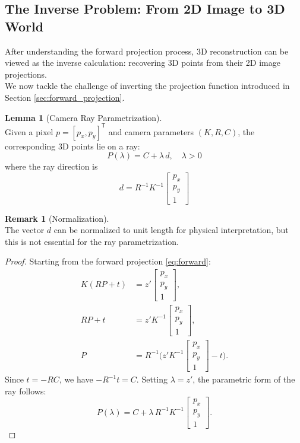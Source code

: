 \documentclass[12pt,a4paper]{article}
\theoremstyle{definition}
\newtheorem{lemma}{Lemma}[subsection]
\newtheorem{remark}{Remark}[subsection]
\begin{document}
\newpage

\subsection{The Inverse Problem: From 2D Image to 3D World} \label{sec:inverse_problem}

After understanding the forward projection process, 3D reconstruction can be viewed as the inverse calculation: recovering 3D points from their 2D image projections. \\  
We now tackle the challenge of inverting the projection function introduced in Section \ref{sec:forward_projection}.

\begin{lemma}[Camera Ray Parametrization] \label{eq:camera_ray} ~\\
Given a pixel \(p = [p_x, p_y]^\mathsf{T}\) and camera parameters \((K, R, C)\), the corresponding 3D points lie on a ray:
\begin{equation}
\boxed{P(\lambda) = C + \lambda \, d, \quad \lambda > 0}
\end{equation}
where the ray direction is
\begin{equation}
\boxed{d = R^{-1} K^{-1} \begin{bmatrix} p_x \\ p_y \\ 1 \end{bmatrix}}
\end{equation}
\begin{remark}[Normalization] ~\\
The vector \(d\) can be normalized to unit length for physical interpretation, but this is not essential for the ray parametrization.
\end{remark}
\end{lemma}

\begin{proof}
Starting from the forward projection \eqref{eq:forward}:
\begin{align*}
K (R P + t) &= z' \begin{bmatrix} p_x \\ p_y \\ 1 \end{bmatrix}, \\
R P + t &= z' K^{-1} \begin{bmatrix} p_x \\ p_y \\ 1 \end{bmatrix}, \\
P &= R^{-1} \bigl(z' K^{-1} \begin{bmatrix} p_x \\ p_y \\ 1 \end{bmatrix} - t \bigr).
\end{align*}
Since \(t = -R C\), we have \(-R^{-1} t = C\). Setting \(\lambda = z'\), the parametric form of the ray follows:
\[
P(\lambda) = C + \lambda \, R^{-1} K^{-1} \begin{bmatrix} p_x \\ p_y \\ 1 \end{bmatrix}.
\]
\end{proof}
\end{document}
